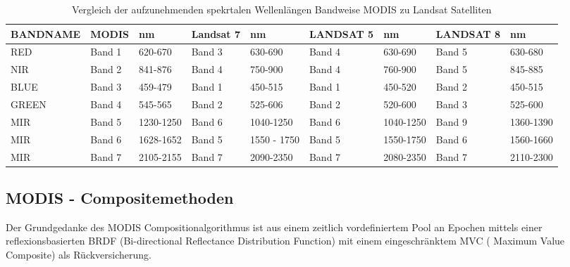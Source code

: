 \documentclass[11pt]{report}
\begin{document}
\begin{table}[!h]
\small
\hspace{-3cm}
\begin{tabular}{|l|l|l|l|l|l|l|l|l|}
\hline
BANDNAME & MODIS & nm & Landsat 7 & nm & LANDSAT 5 & nm & LANDSAT 8 & nm \\ \hline
RED   & Band 1 & 620-670   & Band 3 & 630-690     & Band 4 & 630-690   & Band 5 & 630-680 \\ \hline
NIR   & Band 2 & 841-876   & Band 4 & 750-900     & Band 4 & 760-900   & Band 5 & 845-885 \\ \hline
BLUE  & Band 3 & 459-479   & Band 1 & 450-515     & Band 1 & 450-520   & Band 2 & 450-515 \\ \hline
GREEN & Band 4 & 545-565   & Band 2 & 525-606     & Band 2 & 520-600   & Band 3 & 525-600 \\ \hline
MIR   & Band 5 & 1230-1250 & Band 6 & 1040-1250   & Band 6 & 1040-1250 & Band 9 & 1360-1390 \\ \hline
MIR   & Band 6 & 1628-1652 & Band 5 & 1550 - 1750 & Band 5 & 1550-1750 & Band 6 & 1560-1660 \\ \hline
MIR   & Band 7 & 2105-2155 & Band 7 & 2090-2350   & Band 7 & 2080-2350 & Band 7 & 2110-2300 \\ \hline
\end{tabular}
\caption{Vergleich der aufzunehmenden spekrtalen Wellenlängen Bandweise MODIS zu Landsat Satelliten}
\end{table}


\subsection{MODIS - Compositemethoden}
Der Grundgedanke des MODIS Compositionalgorithmus ist aus einem zeitlich vordefiniertem Pool an Epochen mittels einer reflexionsbasierten BRDF (Bi-directional Reflectance Distribution Function) mit einem eingeschränktem MVC ( Maximum Value Composite) als Rückversicherung. 
\end{document}
